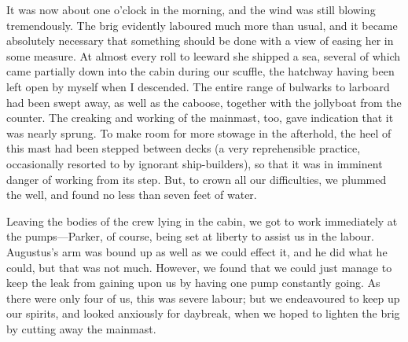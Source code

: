 It was now about one o'clock in the morning, and the wind was still blowing
tremendously. The brig evidently laboured much more than usual, and it became
absolutely necessary that something should be done with a view of easing her in
some measure. At almost every roll to leeward she shipped a sea, several of
which came partially down into the cabin during our scuffle, the hatchway having
been left open by myself when I descended. The entire range of bulwarks to
larboard had been swept away, as well as the caboose, together with the
jollyboat from the counter. The creaking and working of the mainmast, too, gave
indication that it was nearly sprung. To make room for more stowage in the
afterhold, the heel of this mast had been stepped between decks (a very
reprehensible practice, occasionally resorted to by ignorant ship-builders), so
that it was in imminent danger of working from its step. But, to crown all our
difficulties, we plummed the well, and found no less than seven feet of
water. 

Leaving the bodies of the crew lying in the cabin, we got to work immediately
at the pumps---Parker, of course, being set at liberty to assist us in the
labour. Augustus's arm was bound up as well as we could effect it, and he did
what he could, but that was not much. However, we found that we could just
manage to keep the leak from gaining upon us by having one pump constantly
going. As there were only four of us, this was severe labour; but we endeavoured
to keep up our spirits, and looked anxiously for daybreak, when we hoped to
lighten the brig by cutting away the mainmast. 

